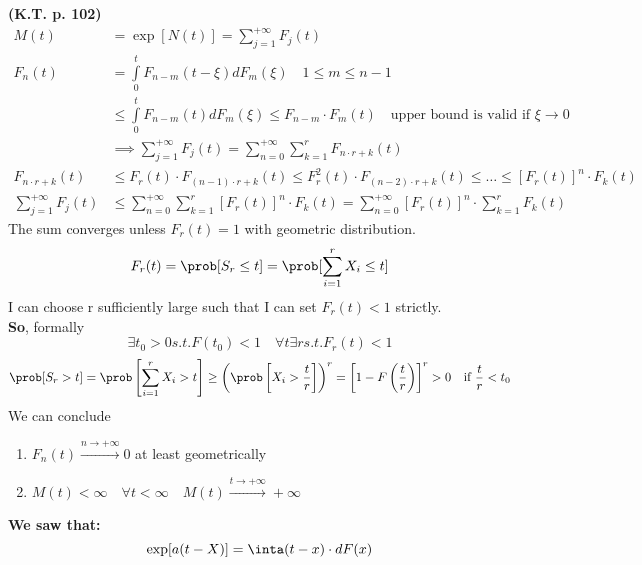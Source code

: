  \textbf{(K.T. p. 102)}
\begin{equation}
  \begin{split}
    M(t) &= \exp[N(t)] = \sum\limits_{j=1}^{+\infty}F_j(t) \\
    F_n(t) &= \int\limits_0^t F_{n-m}(t-\xi) dF_m(\xi) \quad 1 \le m \le n-1\\
    & \le \int\limits_0^t F_{n-m}(t) dF_m(\xi) \le F_{n-m} \cdot F_m(t) \quad \text{upper bound is valid if }\xi \to 0 \\
    &\implies  \sum\limits_{j=1}^{+\infty}F_j(t)= \sum\limits_{n=0}^{+\infty} \sum\limits_{k=1}^{r}F_{n \cdot r + k}(t) \\
    F_{n \cdot r + k} (t) &\le F_r(t) \cdot F_{(n-1)\cdot r + k}(t) \le F_r^2(t) \cdot F_{(n-2)\cdot r +k}(t) \le \dots
    \le \left[F_r(t)\right]^n \cdot F_k(t)\\
    \sum\limits_{j=1}^{+\infty}F_j(t) &\le \sum\limits_{n=0}^{+\infty} \sum\limits_{k=1}^{r}\left[F_r(t)\right]^n \cdot F_k(t)
    = \sum\limits_{n=0}^{+\infty} \left[F_r(t)\right]^n \cdot \sum\limits_{k=1}^{r}F_k(t)
  \end{split}
\end{equation}
The sum converges unless $F_r(t)=1$ with geometric distribution.
\begin{equation}
  F_r(t)=\prob[S_r\le t]=\prob[\sum\limits_{i=1}^r X_i \le t]
\end{equation}
I can choose r sufficiently large such that I can set $F_r(t)<1$ strictly. \\
\textbf{So}, formally
\begin{equation*}
  \exists t_0 >0 s.t. F(t_0)<1 \quad \forall t \exists r s.t. F_r(t)<1
\end{equation*}
\begin{equation*}
  \prob[S_r >t] = \prob\left[\sum\limits_{i=1}^r X_i > t \right] \ge
  \left(\prob\left[X_i > \frac{t}{r}\right]\right)^r = \left[1-F\left(\frac{t}{r}\right)\right]^r>0
  \quad \text{if }\frac{t}{r}<t_0
\end{equation*}
We can conclude
\begin{enumerate}
  \item $F_n(t)\xrightarrow{n\to +\infty}0$ at least geometrically
  \item $M(t)<\infty \quad \forall t < \infty \quad M(t)\xrightarrow{t \to +\infty}+\infty$
\end{enumerate}

\textbf{We saw that:}
$$\exp[a(t-X)]=\inta(t-x)\cdot dF(x)$$

